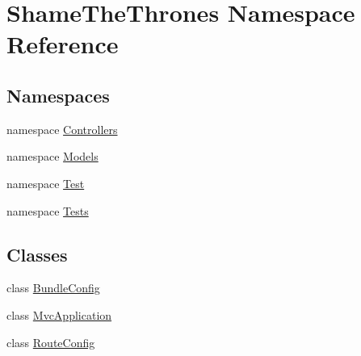 \hypertarget{namespace_shame_the_thrones}{}\section{Shame\+The\+Thrones Namespace Reference}
\label{namespace_shame_the_thrones}
\subsection*{Namespaces}
\begin{DoxyCompactItemize}
\item 
namespace \hyperlink{namespace_shame_the_thrones_1_1_controllers}{Controllers}
\item 
namespace \hyperlink{namespace_shame_the_thrones_1_1_models}{Models}
\item 
namespace \hyperlink{namespace_shame_the_thrones_1_1_test}{Test}
\item 
namespace \hyperlink{namespace_shame_the_thrones_1_1_tests}{Tests}
\end{DoxyCompactItemize}
\subsection*{Classes}
\begin{DoxyCompactItemize}
\item 
class \hyperlink{class_shame_the_thrones_1_1_bundle_config}{Bundle\+Config}
\item 
class \hyperlink{class_shame_the_thrones_1_1_mvc_application}{Mvc\+Application}
\item 
class \hyperlink{class_shame_the_thrones_1_1_route_config}{Route\+Config}
\end{DoxyCompactItemize}
